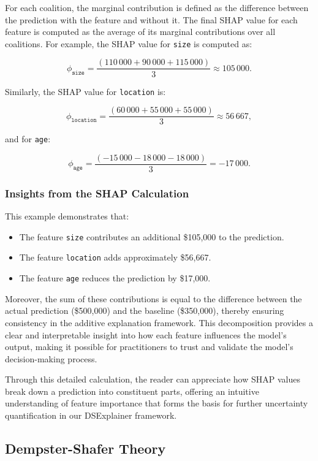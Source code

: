 \documentclass[acmlarge]{acmart}
\begin{document}
For each coalition, the marginal contribution is defined as the difference between the prediction with the feature and without it. The final SHAP value for each feature is computed as the average of its marginal contributions over all coalitions. For example, the SHAP value for \texttt{size} is computed as:

\[
\phi_{\texttt{size}} = \frac{(110\,000 + 90\,000 + 115\,000)}{3} \approx 105\,000.
\]

Similarly, the SHAP value for \texttt{location} is:

\[
\phi_{\texttt{location}} = \frac{(60\,000 + 55\,000 + 55\,000)}{3} \approx 56\,667,
\]

and for \texttt{age}:

\[
\phi_{\texttt{age}} = \frac{(-15\,000 - 18\,000 - 18\,000)}{3} = -17\,000.
\]

\subsubsection{Insights from the SHAP Calculation}

This example demonstrates that:
\begin{itemize}
    \item The feature \texttt{size} contributes an additional \$105,000 to the prediction.
    \item The feature \texttt{location} adds approximately \$56,667.
    \item The feature \texttt{age} reduces the prediction by \$17,000.
\end{itemize}

Moreover, the sum of these contributions is equal to the difference between the actual prediction (\$500,000) and the baseline (\$350,000), thereby ensuring consistency in the additive explanation framework. This decomposition provides a clear and interpretable insight into how each feature influences the model’s output, making it possible for practitioners to trust and validate the model’s decision-making process.

Through this detailed calculation, the reader can appreciate how SHAP values break down a prediction into constituent parts, offering an intuitive understanding of feature importance that forms the basis for further uncertainty quantification in our DSExplainer framework.




\subsection{Dempster-Shafer Theory}
\end{document}
